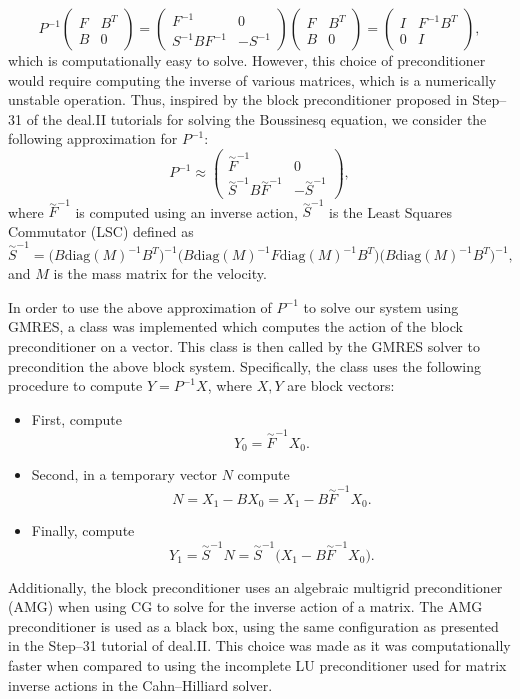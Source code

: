\documentclass[11pt,fullpage]{article}
\theoremstyle{lemma}
\theoremstyle{definition}
\theoremstyle{lemma}
\begin{document}
	$$
P^{-1}\begin{pmatrix}
F & B^T \\
B & 0
\end{pmatrix} = \begin{pmatrix}
F^{-1} & 0 \\
S^{-1}BF^{-1} & -S^{-1}
\end{pmatrix}\begin{pmatrix}
F & B^T \\
B & 0
\end{pmatrix} = \begin{pmatrix}
I & F^{-1}B^T \\
0 & I
\end{pmatrix},
$$
which is computationally easy to solve. However, this choice of preconditioner would require computing the inverse of various matrices, which is a numerically unstable operation. Thus, inspired by the block preconditioner proposed in Step--31 of the deal.II tutorials for solving the Boussinesq equation, we consider the following approximation for $P^{-1}$:
$$
	P^{-1} \approx \begin{pmatrix}
	\overset{\sim}{F}^{-1} & 0\\
	\overset{\sim}{S}^{-1}B\overset{\sim}{F}^{-1} & -\overset{\sim}{S}^{-1}
	\end{pmatrix},
$$
where $\overset{\sim}{F}^{-1}$ is computed using an inverse action, $\overset{\sim}{S}^{-1}$ is the Least Squares Commutator (LSC) \cite{Precond} defined as
$$
\overset{\sim}{S}^{-1} = \big(B\text{diag}(M)^{-1}B^T\big)^{-1}\big(B\text{diag}(M)^{-1}F\text{diag}(M)^{-1}B^T\big)\big(B\text{diag}(M)^{-1}B^T\big)^{-1},
$$
and $M$ is the mass matrix for the velocity.

In order to use the above approximation of $P^{-1}$ to solve our system using GMRES, a class was implemented which computes the action of the block preconditioner on a vector. This class is then called by the GMRES solver to precondition the above block system. Specifically, the class uses the following procedure to compute $Y = P^{-1}X$, where $X,Y$ are block vectors:
\begin{itemize}
	\item First, compute
	$$
	Y_0 = \overset{\sim}{F}^{-1}X_0.
	$$
	\item Second, in a temporary vector $N$ compute
	$$
	N = X_1 - BX_0 = X_1 - B\overset{\sim}{F}^{-1}X_0.
	$$
	\item Finally, compute
	$$
	Y_1 = \overset{\sim}{S}^{-1}N = \overset{\sim}{S}^{-1}\big(X_1 - B\overset{\sim}{F}^{-1}X_0\big).
	$$
\end{itemize}
Additionally, the block preconditioner uses an algebraic multigrid preconditioner (AMG) when using CG to solve for the inverse action of a matrix. The AMG preconditioner is used as a black box, using the same configuration as presented in the Step--31 tutorial of deal.II. This choice was made as it was computationally faster when compared to using the incomplete LU preconditioner used for matrix inverse actions in the Cahn--Hilliard solver.
\end{document}
